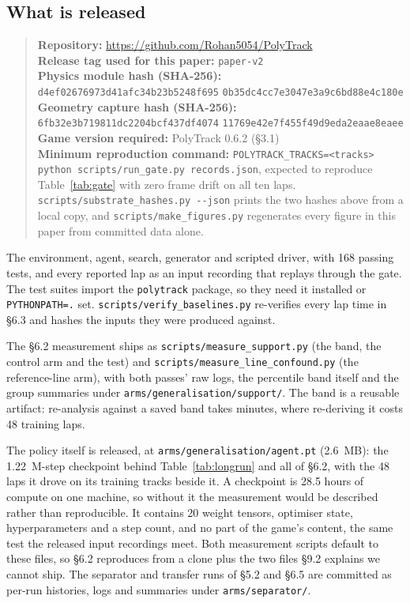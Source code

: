 \documentclass[11pt]{article}
\begin{document}
\subsection{What is released}

\begin{quote}
\small
\textbf{Repository:} \url{https://github.com/Rohan5054/PolyTrack} \\
\textbf{Release tag used for this paper:} \texttt{paper-v2} \\
\textbf{Physics module hash (SHA-256):} \texttt{d4ef02676973d41afc34b23b5248f695} \texttt{0b35dc4cc7e3047e3a9c6bd88e4c180e} \\
\textbf{Geometry capture hash (SHA-256):} \texttt{6fb32e3b719811dc2204bcf437df4074} \texttt{11769e42e7f455f49d9eda2eaae8eaee} \\
\textbf{Game version required:} PolyTrack 0.6.2 (\S3.1) \\
\textbf{Minimum reproduction command:} \texttt{POLYTRACK\_TRACKS=<tracks> python scripts/run\_gate.py records.json}, expected to reproduce Table~\ref{tab:gate} with zero frame drift on all ten laps. \texttt{scripts/substrate\_hashes.py -{}-json} prints the two hashes above from a local copy, and \texttt{scripts/make\_figures.py} regenerates every figure in this paper from committed data alone.
\end{quote}

The environment, agent, search, generator and scripted driver, with 168 passing tests, and every reported lap as an input recording that replays through the gate. The test suites import the \texttt{polytrack} package, so they need it installed or \texttt{PYTHONPATH=.} set. \texttt{scripts/verify\_baselines.py} re-verifies every lap time in \S6.3 and hashes the inputs they were produced against.

The \S6.2 measurement ships as \texttt{scripts/measure\_support.py} (the band, the control arm and the test) and \texttt{scripts/measure\_line\_confound.py} (the reference-line arm), with both passes' raw logs, the percentile band itself and the group summaries under \texttt{arms/generalisation/support/}. The band is a reusable artifact: re-analysis against a saved band takes minutes, where re-deriving it costs 48 training laps.

The policy itself is released, at \texttt{arms/generalisation/agent.pt} (2.6~MB): the 1.22~M-step checkpoint behind Table~\ref{tab:longrun} and all of \S6.2, with the 48 laps it drove on its training tracks beside it. A checkpoint is 28.5 hours of compute on one machine, so without it the measurement would be described rather than reproducible. It contains 20 weight tensors, optimiser state, hyperparameters and a step count, and no part of the game's content, the same test the released input recordings meet. Both measurement scripts default to these files, so \S6.2 reproduces from a clone plus the two files \S9.2 explains we cannot ship. The separator and transfer runs of \S5.2 and \S6.5 are committed as per-run histories, logs and summaries under \texttt{arms/separator/}.
\end{document}
